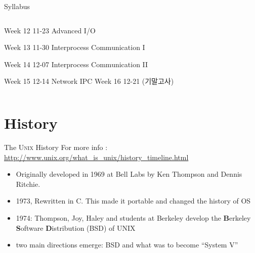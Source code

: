 \documentclass[newPxFont,sthlmFooter,nooffset]{beamer}
\begin{document}
\begin{frame}[t]{Syllabus}
\begin{columns}
\begin{column}{.48\linewidth}
Week 12 11-23 Advanced I/O

\hangindent=1cm
Week 13 11-30 Interprocess Communication I

\hangindent=1cm
Week 14 12-07 Interprocess Communication II

Week 15 12-14 Network IPC
Week 16 12-21 (기말고사)
\end{column}
\end{columns}
\end{frame}



\section{History}
\begin{frame}[t]{The \textsc{Unix} History}
For more info : 
\url{http://www.unix.org/what_is_unix/history_timeline.html}
\bigskip
\begin{itemize}
	\item Originally developed in 1969 at Bell Labs by Ken Thompson
		and Dennis Ritchie.
	\item 1973, Rewritten in C. This made it portable and changed the history of OS
	\item 1974: Thompson, Joy, Haley and students at Berkeley develop
		the {\bf B}erkeley {\bf S}oftware {\bf D}istribution (BSD) of UNIX
	\item two main directions emerge: BSD and what was to become ``System V''
\end{itemize}
\end{frame}
\end{document}
